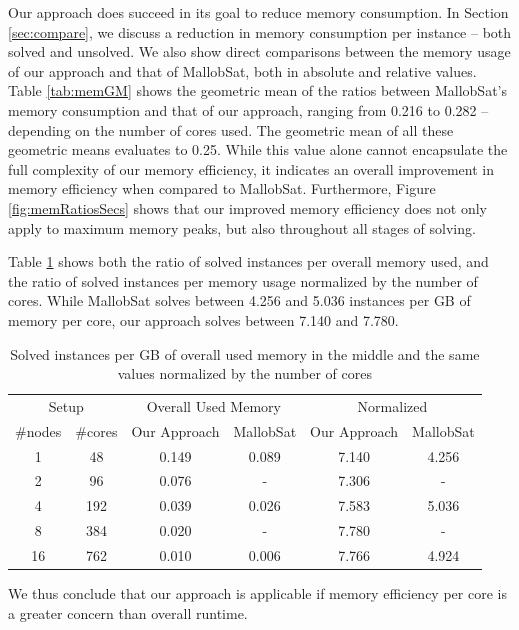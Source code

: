 \documentclass[12pt,a4paper,twoside]{scrartcl}
\numberwithin{equation}{section}
\begin{document}
Our approach does succeed in its goal to reduce memory consumption. In Section \ref{sec:compare}, we discuss a reduction in memory consumption per instance -- both solved and unsolved. We also show direct comparisons between the memory usage of our approach and that of MallobSat, both in absolute and relative values. Table \ref{tab:memGM} shows the geometric mean of the ratios between MallobSat's memory consumption and that of our approach, ranging from 0.216 to 0.282 -- depending on the number of cores used. The geometric mean of all these geometric means evaluates to 0.25. While this value alone cannot encapsulate the full complexity of our memory efficiency, it indicates an overall improvement in memory efficiency when compared to MallobSat. Furthermore, Figure \ref{fig:memRatiosSecs} shows that our improved memory efficiency does not only apply to maximum memory peaks, but also throughout all stages of solving.

Table \ref{tab:solvedPerGB} shows both the ratio of solved instances per overall memory used, and the ratio of solved instances per memory usage normalized by the number of cores. While MallobSat solves between 4.256 and 5.036 instances per GB of memory per core, our approach solves between 7.140 and 7.780.

\begin{table}
  \center
  \begin{tabular}{ cccccc }
    \toprule
    \multicolumn{2}{c}{Setup} & \multicolumn{2}{c}{Overall Used Memory} & \multicolumn{2}{c}{Normalized}\\
    \#nodes & \#cores & Our Approach & MallobSat & Our Approach & MallobSat \\
    \midrule
    1  & 48  & 0.149 & 0.089 & 7.140 & 4.256\\
    2  & 96  & 0.076 & -     & 7.306 & -\\
    4  & 192 & 0.039 & 0.026 & 7.583 & 5.036\\
    8  & 384 & 0.020 & -     & 7.780 & -\\
    16 & 762 & 0.010 & 0.006 & 7.766 & 4.924\\
    \bottomrule
  \end{tabular}
  \caption{Solved instances per GB of overall used memory in the middle and the same values normalized by the number of cores}
  \label{tab:solvedPerGB}
\end{table}

We thus conclude that our approach is applicable if memory efficiency per core is a greater concern than overall runtime. 
\end{document}
